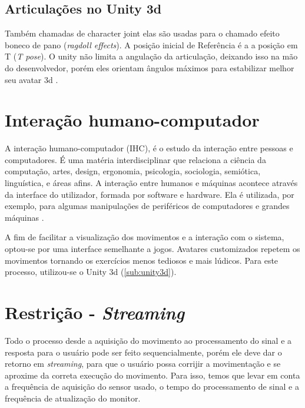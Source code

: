 \begin{table}[H]
\begin{tabular}{|c|c|c|}
   \end{tabular}
   \end{table}


  \subsection{Articulações no Unity 3d}
  \label{sec:Articulacoes no Unity 3d}
    Também chamadas de character joint elas são usadas para o chamado efeito
  boneco de pano (\textit{ragdoll effects}). A posição inicial de Referência é a
  a posição em T (\textit{T pose}). O unity não limita a angulação da articulação,
  deixando isso na mão do desenvolvedor, porém eles orientam ângulos máximos
  para estabilizar melhor seu avatar 3d \cite{unity3dManual}.


  \section{Interação humano-computador}
  \label{sec:ihc}
  A interação humano-computador (IHC), é o estudo da interação entre pessoas e computadores.
  É uma matéria interdisciplinar que relaciona a ciência da computação,
  artes, design, ergonomia, psicologia, sociologia, semiótica, linguística, e áreas afins.
  A interação entre humanos e máquinas acontece através da interface do utilizador,
  formada por software e hardware. Ela é utilizada, por exemplo, para algumas manipulações
  de periféricos de computadores e grandes máquinas \cite{ihc}.

  A fim de facilitar a visualização dos movimentos e a interação com o sistema, optou-se por uma interface semelhante a jogos.
  Avatares customizados repetem os movimentos tornando os exercícios menos tediosos e mais lúdicos. Para este processo, utilizou-se
  o Unity 3d (\ref{sub:unity3d}).

  \section{Restrição - \textit{Streaming}}
  \label{sec:restrição}
    Todo o processo desde a aquisição do movimento ao processamento do sinal e a
  resposta para o usuário pode ser feito sequencialmente, porém ele deve dar o
  retorno em  \textit{streaming}, para que o usuário possa corrijir a movimentação e se
  aproxime da correta execução do movimento. Para isso, temos que levar em conta
  a frequência de aquisição do sensor usado, o tempo do processamento de sinal e
  a frequência de atualização do monitor.

